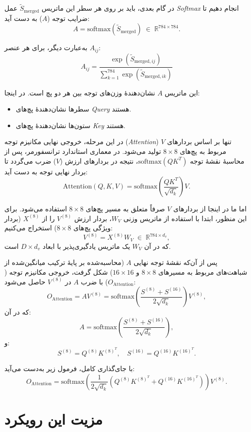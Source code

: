 در گام بعدی، باید بر روی هر سطر این ماتریس \(\tilde{S}_{\text{merged}}\) عمل \textit{Softmax} انجام دهیم تا ضرایب توجه (\(A\)) به دست آید:
\[
A = \text{softmax}(\tilde{S}_{\text{merged}}) \; \in \; \mathbb{R}^{784 \times 784}.
\]

به‌عبارت دیگر، برای هر عنصر \(A_{ij}\):
\[
A_{ij} = \frac{\exp(\tilde{S}_{\text{merged}, ij})}{\sum_{k=1}^{784} \exp(\tilde{S}_{\text{merged}, ik})}
\]

این ماتریس \(A\) نشان‌دهندهٔ وزن‌های توجه بین هر دو پچ است. در اینجا:
\begin{itemize}
	\item سطرها نشان‌دهندهٔ پچ‌های \textit{Query} هستند.
	\item ستون‌ها نشان‌دهندهٔ پچ‌های \textit{Key} هستند.
\end{itemize}

در این مرحله، خروجی نهایی مکانیزم توجه (\textit{Attention}) تنها بر اساس بردارهای \(V\) مربوط به پچ‌های \(8 \times 8\) تولید می‌شود. در معماری استاندارد ترانسفورمر، پس از محاسبهٔ نقشهٔ توجه \(\text{softmax}(QK^T)\)، نتیجه در بردارهای ارزش (\(V\)) ضرب می‌گردد تا بردار نهایی توجه به دست آید:
\[
\text{Attention}(Q, K, V) = \text{softmax} \left( \frac{QK^T}{\sqrt{d_k}} \right) V.
\]

اما ما در اینجا از بردارهای \(V\) صرفاً متعلق به مسیر پچ‌های \(8 \times 8\) استفاده می‌شود. برای این منظور، ابتدا با استفاده از ماتریس وزنی \(W_V\)، بردار ارزش \(V^{(8)}\) را از \(X^{(8)}\) (بردار ویژگی پچ‌های \(8 \times 8\)) استخراج می‌کنیم:
\[
V^{(8)} = X^{(8)} W_V \; \in \; \mathbb{R}^{784 \times d_v},
\]
که در آن \(W_V\) یک ماتریس یادگیری‌پذیر با ابعاد \(D \times d_v\) است. 

پس از آن‌که نقشهٔ توجه نهایی \(A\) (محاسبه‌شده بر پایهٔ ترکیب میانگین‌شده از شباهت‌های مربوط به مسیرهای \(8 \times 8\) و \(16 \times 16\)) شکل گرفت، خروجی مکانیزم توجه (\(O_{\text{Attention}}\)) با ضرب \(A\) در \(V^{(8)}\) حاصل می‌شود:
\[
O_{\text{Attention}} = A V^{(8)} = \text{softmax} \left( \frac{S^{(8)} + S^{(16)}}{2 \sqrt{d_k}} \right) V^{(8)},
\]
که در آن:
\[
A = \text{softmax} \left( \frac{S^{(8)} + S^{(16)}}{2 \sqrt{d_k}} \right),
\]
و:
\[
S^{(8)} = Q^{(8)} K^{(8)^T}, \quad S^{(16)} = Q^{(16)} K^{(16)^T}.
\]

با جای‌گذاری کامل، فرمول زیر به‌دست می‌آید:
\[
O_{\text{Attention}} = \text{softmax} \left( \frac{1}{2 \sqrt{d_k}} \left( Q^{(8)} K^{(8)^T} + Q^{(16)} K^{(16)^T} \right) \right) V^{(8)}.
\]

\section*{مزیت این رویکرد}

